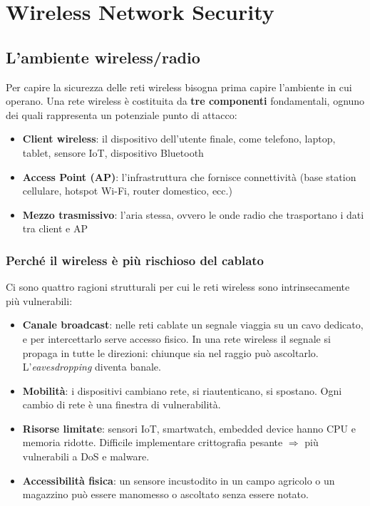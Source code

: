 % 
\chapter{Wireless Network Security}

\section{L'ambiente wireless/radio}

Per capire la sicurezza delle reti wireless bisogna prima capire l'ambiente in cui operano. Una rete wireless \`e costituita da \textbf{tre componenti} fondamentali, ognuno dei quali rappresenta un potenziale punto di attacco:

\begin{itemize}
  \item \textbf{Client wireless}: il dispositivo dell'utente finale, come telefono, laptop, tablet, sensore IoT, dispositivo Bluetooth
  \item \textbf{Access Point (AP)}: l'infrastruttura che fornisce connettivit\`a (base station cellulare, hotspot Wi-Fi, router domestico, ecc.)
  \item \textbf{Mezzo trasmissivo}: l'aria stessa, ovvero le onde radio che trasportano i dati tra client e AP
\end{itemize}

\subsection{Perch\'e il wireless \`e pi\`u rischioso del cablato}

Ci sono quattro ragioni strutturali per cui le reti wireless sono intrinsecamente pi\`u vulnerabili:

\begin{itemize}
  \item \textbf{Canale broadcast}: nelle reti cablate un segnale viaggia su un cavo dedicato, e per intercettarlo serve accesso fisico. In una rete wireless il segnale si propaga in tutte le direzioni: chiunque sia nel raggio pu\`o ascoltarlo. L'\textit{eavesdropping} diventa banale.
  \item \textbf{Mobilit\`a}: i dispositivi cambiano rete, si riautenticano, si spostano. Ogni cambio di rete \`e una finestra di vulnerabilit\`a.
  \item \textbf{Risorse limitate}: sensori IoT, smartwatch, embedded device hanno CPU e memoria ridotte. Difficile implementare crittografia pesante $\Rightarrow$ pi\`u vulnerabili a DoS e malware.
  \item \textbf{Accessibilit\`a fisica}: un sensore incustodito in un campo agricolo o un magazzino pu\`o essere manomesso o ascoltato senza essere notato.
\end{itemize}

